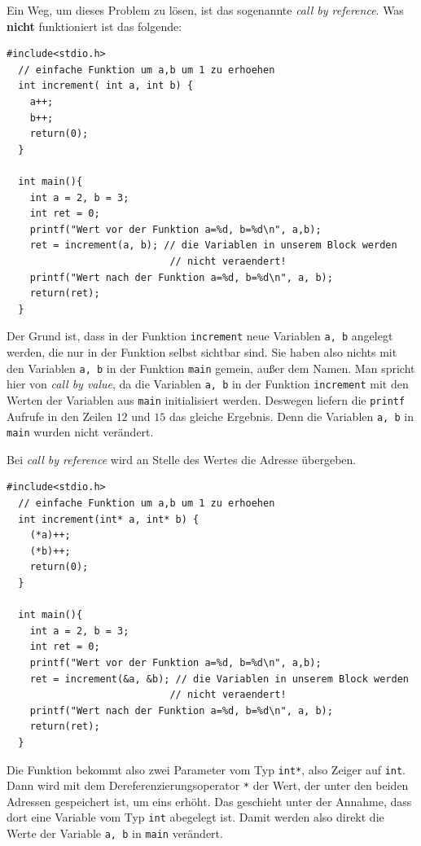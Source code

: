 Ein Weg, um dieses Problem zu lösen, ist das sogenannte \emph{call by reference}.
Was \textbf{nicht} funktioniert ist das folgende:
\begin{lstlisting}
#include<stdio.h>
  // einfache Funktion um a,b um 1 zu erhoehen
  int increment( int a, int b) { 
    a++;
    b++;
    return(0);
  }
  
  int main(){
    int a = 2, b = 3;
    int ret = 0;
    printf("Wert vor der Funktion a=%d, b=%d\n", a,b);
    ret = increment(a, b); // die Variablen in unserem Block werden 
                            // nicht veraendert!
    printf("Wert nach der Funktion a=%d, b=%d\n", a, b); 
    return(ret);
  }
\end{lstlisting}
Der Grund ist, dass in der Funktion \verb|increment| neue Variablen \verb|a, b| angelegt werden, die nur in der Funktion selbst sichtbar sind. 
Sie haben also nichts mit den Variablen \verb|a, b| in der Funktion \verb|main| gemein, außer dem Namen.
Man spricht hier von \emph{call by value}, da die Variablen \verb|a, b| in der Funktion \verb|increment| mit den Werten der Variablen aus \verb|main| initialisiert werden.
Deswegen liefern die \verb|printf| Aufrufe in den Zeilen $12$ und $15$ das gleiche Ergebnis.
Denn die Variablen \verb|a, b| in \verb|main| wurden nicht verändert.

Bei \emph{call by reference} wird an Stelle des Wertes die Adresse übergeben.
\begin{lstlisting}
#include<stdio.h>
  // einfache Funktion um a,b um 1 zu erhoehen
  int increment(int* a, int* b) { 
    (*a)++;
    (*b)++;
    return(0);
  }
  
  int main(){
    int a = 2, b = 3;
    int ret = 0;
    printf("Wert vor der Funktion a=%d, b=%d\n", a,b);
    ret = increment(&a, &b); // die Variablen in unserem Block werden 
                            // nicht veraendert!
    printf("Wert nach der Funktion a=%d, b=%d\n", a, b); 
    return(ret);
  }
\end{lstlisting}
Die Funktion bekommt also zwei Parameter vom Typ \verb|int*|, also Zeiger auf \verb|int|. 
Dann wird mit dem Dereferenzierungsoperator \verb|*| der Wert, der unter den beiden Adressen gespeichert ist, um eins erhöht.
Das geschieht unter der Annahme, dass dort eine Variable vom Typ \verb|int| abegelegt ist.
Damit werden also direkt die Werte der Variable \verb|a, b| in \verb|main| verändert.

